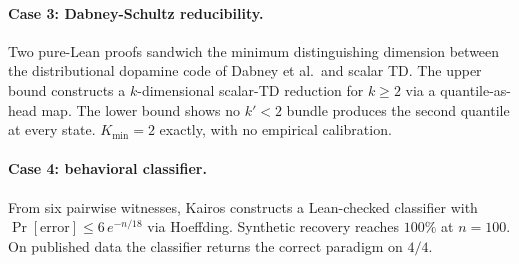\paragraph{Case 3: Dabney-Schultz reducibility.}
Two pure-Lean proofs sandwich the minimum distinguishing dimension
between the distributional dopamine code of Dabney et al.\ and
scalar TD. The upper bound constructs a $k$-dimensional
scalar-TD reduction for $k \ge 2$ via a quantile-as-head map.
The lower bound shows no $k' < 2$ bundle produces the second
quantile at every state. $K_{\min} = 2$ exactly, with no empirical
calibration.

\paragraph{Case 4: behavioral classifier.}
From six pairwise witnesses, Kairos constructs a Lean-checked
classifier with $\Pr[\text{error}] \le 6\,e^{-n/18}$ via Hoeffding.
Synthetic recovery reaches $100\%$ at $n = 100$. On published data
the classifier returns the correct paradigm on $4/4$.
